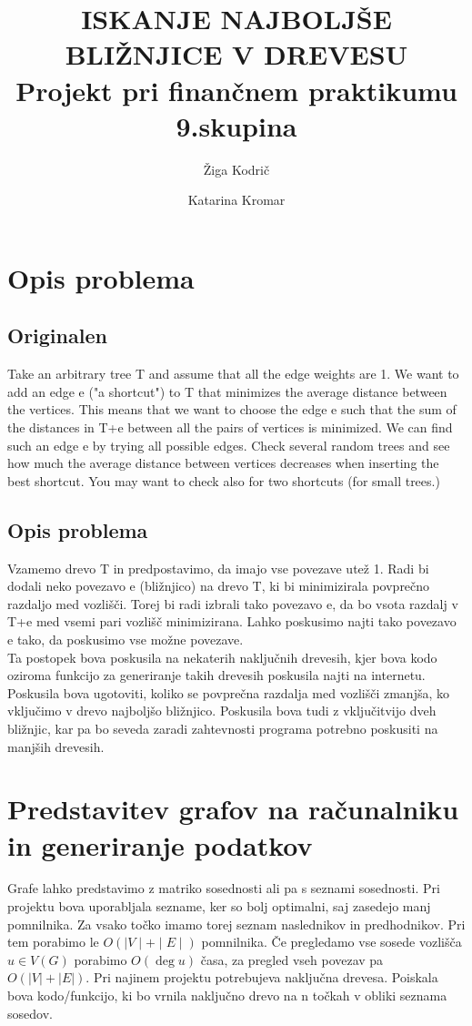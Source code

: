 \documentclass[a4paper,10pt]{article}
\begin{document}
\title{ ISKANJE NAJBOLJŠE BLIŽNJICE V DREVESU \\ \large Projekt pri finančnem praktikumu \\ 9.skupina}
\author{Žiga Kodrič \and Katarina Kromar}
\maketitle

\section{Opis problema}
\subsection{Originalen}
Take an arbitrary tree T and assume that all the edge weights are 1. We want to add an edge e ("a shortcut") to T that minimizes the average distance between the vertices. This means that we want to choose the edge e such that the sum of the distances in T+e between all the pairs of vertices is minimized. We can find such an edge e by trying all possible edges. Check several random trees and see how much the average distance between vertices decreases when inserting the best shortcut. You may want to check also for two shortcuts (for small trees.)

\subsection{Opis problema}
Vzamemo drevo T in predpostavimo, da imajo vse povezave utež 1. Radi bi dodali neko povezavo e (bližnjico) na drevo T, ki bi minimizirala povprečno razdaljo med vozlišči. Torej bi radi izbrali tako povezavo e, da bo vsota razdalj v T+e med vsemi pari vozlišč minimizirana. Lahko poskusimo najti tako povezavo e tako, da poskusimo vse možne povezave. 
\\[0.5cm]
Ta postopek bova poskusila na nekaterih naključnih drevesih, kjer bova kodo oziroma funkcijo za generiranje takih drevesih poskusila najti na internetu. Poskusila bova ugotoviti, koliko se povprečna razdalja med vozlišči zmanjša, ko vključimo v drevo najboljšo bližnjico. Poskusila bova tudi z vključitvijo dveh bližnjic, kar pa bo seveda zaradi zahtevnosti programa potrebno poskusiti na manjših drevesih.

\section{Predstavitev grafov na računalniku in generiranje podatkov}
Grafe lahko predstavimo z matriko sosednosti ali pa s seznami sosednosti. Pri projektu bova uporabljala sezname, ker so bolj optimalni, saj zasedejo manj pomnilnika. Za vsako točko imamo torej seznam naslednikov in predhodnikov. Pri tem porabimo le $O(\mid V \mid + \mid E \mid)$ pomnilnika.
Če pregledamo vse sosede vozlišča $ u \in  V(G) $  porabimo $ O(\deg u)$ časa, za pregled vseh povezav pa $O(|V|+|E|)$.
Pri najinem projektu potrebujeva naključna drevesa. Poiskala bova kodo/funkcijo, ki bo vrnila naključno drevo na n točkah v obliki seznama sosedov.
\end{document}
